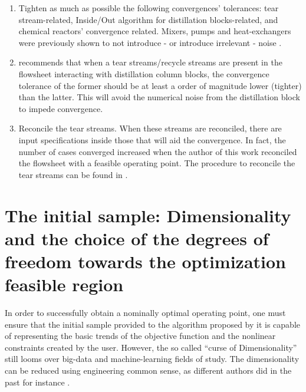 \documentclass[../msc-thesis.tex]{subfiles}
\begin{document}
\begin{enumerate}
    \item Tighten as much as possible the following convergences' tolerances: 
    tear stream-related, Inside/Out algorithm for distillation blocks-related, 
    and chemical reactors' convergence related. Mixers, pumps and heat-exchangers 
    were previously shown to not introduce - or introduce irrelevant - noise 
    \cite{Quirante2016}.

    \item \textcite{Aspentech2017} recommends that when a tear streams/recycle 
    streams are present in the flowsheet interacting with distillation column 
    blocks, the convergence tolerance of the former should be at least a 
    order of magnitude lower (tighter) than the latter. This will avoid the 
    numerical noise from the distillation block to impede convergence.

    \item Reconcile the tear streams. When these streams are reconciled, 
    there are input specifications inside those that will aid the convergence. 
    In fact, the number of cases converged increased when the author of this 
    work reconciled the flowsheet with a feasible operating point. The 
    procedure to reconcile the tear streams can be found in 
    \textcite{Aspentech2017}.

\end{enumerate}

\section{The initial sample: Dimensionality and the choice of the degrees of 
freedom towards the optimization feasible region} \label{subsection:point2}

In order to successfully obtain a nominally optimal operating point, one must 
ensure that the initial sample provided to the algorithm proposed by 
\textcite{Caballero2008} it is capable of representing the basic trends of the 
objective function and the nonlinear constraints created by the user. However, 
the so called ``curse of Dimensionality'' \textcite{Forrester2008} still looms 
over big-data and machine-learning fields of study. The dimensionality can 
be reduced using engineering common sense, as different authors did in the 
past for instance \cite{Araujo2007,Araujo2008,Gera2013}. 
\end{document}
